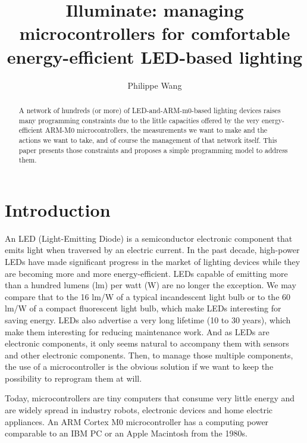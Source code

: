 \documentclass[12pt,twoside,a4paper]{article}
\author{Philippe  Wang}
\title{Illuminate: managing microcontrollers for comfortable
  energy-efficient LED-based lighting}
\date{}
\begin{document}

\maketitle

\begin{abstract}
  A  network of  hundreds (or  more) of  LED-and-ARM-m0-based lighting
  devices  raises  many  programming  constraints due  to  the  little
  capacities   offered    by   the   very    energy-efficient   ARM-M0
  microcontrollers, the  measurements we want to make  and the actions
  we  want to  take,  and of  course  the management  of that  network
  itself. This paper presents  those constraints and proposes a simple
  programming model to address them.
\end{abstract}


\section{Introduction}

An LED (Light-Emitting Diode)  is a semiconductor electronic component
that emits light  when traversed by an electric  current.  In the past
decade, high-power  LEDs have made significant progress  in the market
of   lighting  devices  while   they  are   becoming  more   and  more
energy-efficient. LEDs capable of  emitting more than a hundred lumens
(lm) per watt (W) are no  longer the exception. We may compare that to
the 16 lm/W of a typical incandescent  light bulb or to the 60 lm/W of
a  compact fluorescent  light bulb,  which make  LEDs  interesting for
saving energy.   LEDs also  advertise a very  long lifetime (10  to 30
years),  which make  them interesting  for reducing  maintenance work.
And  as LEDs  are  electronic  components, it  only  seems natural  to
accompany them with sensors and other electronic components.  Then, to
manage those multiple components, the  use of a microcontroller is the
obvious solution if we want to keep the possibility to reprogram them
at will.

Today, microcontrollers  are tiny  computers that consume  very little
energy and  are widely spread  in industry robots,  electronic devices
and    home     electric    appliances.     An     ARM    Cortex    M0
microcontroller\cite{m0web,m0tech} has a computing power comparable to
an IBM PC or an Apple Macintosh from the 1980s.
\end{document}
